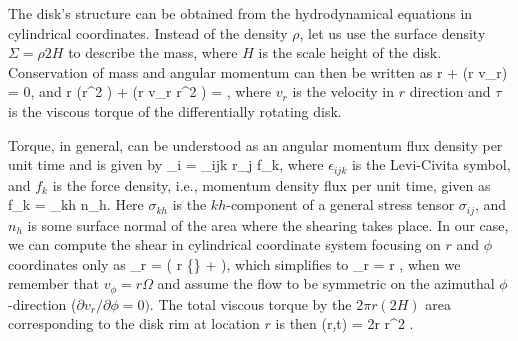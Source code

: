 The disk's structure can be obtained from the hydrodynamical equations in cylindrical coordinates.
Instead of the density $\rho$, let us use the surface density $\Sigma = \rho 2 H$ to describe the mass, where $H$ is the scale height of the disk.
Conservation of mass and angular momentum can then be written as\cite[see e.g.,][for full derivation]{Cho98, FKR02}
\be\label{eq:disk_1}
r  + (r \Sigma v_r) = 0,
\ee
and
\be\label{eq:disk_2}
r (\Sigma r^2 \Omega) +  (r \Sigma v_r r^2 \Omega) =  ,
\ee
where $v_r$ is the velocity in $r$ direction and $\tau$ is the viscous torque of the differentially rotating disk.

Torque, in general, can be understood as an angular momentum flux density per unit time and is given by
\be
\tau_i = \epsilon_{ijk} r_j f_k,
\ee
where $\epsilon_{ijk}$ is the Levi-Civita symbol, and $f_k$ is the force density, i.e., momentum density flux per unit time, given as
\be
f_k = \sigma_{kh} n_h.
\ee
Here $\sigma_{kh}$ is the $kh$-component of a general stress tensor $\sigma_{ij}$, and $n_h$ is some surface normal of the area where the shearing takes place.
In our case, we can compute the shear in cylindrical coordinate system focusing on $r$ and $\phi$ coordinates only as\cite[see, e.g.,][]{Cho98}
\be
\sigma_{r\phi} = \rho \nu \left( r  \left\{\right\} +   \right),
\ee
which simplifies to 
\be
\sigma_{r\phi} = \rho \nu r ,
\ee
when we remember that $v_{\phi} = r \Omega$ and assume the flow to be symmetric on the azimuthal $\phi$-direction ($\partial v_r/\partial \phi = 0)$.
The total viscous torque   by the $2\pi r (2 H)$ area corresponding to the disk rim at location $r$ is then
\be
\tau(r,t) = 2\pi r \nu \Sigma r^2 .
\ee

